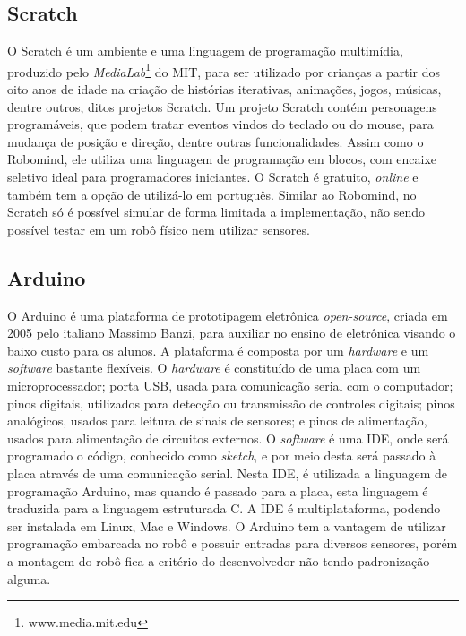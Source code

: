\subsection{Scratch}
O Scratch é um ambiente e uma linguagem de programação multimídia, produzido pelo \textit{MediaLab}\footnote{www.media.mit.edu} do MIT, para ser utilizado por crianças a partir dos oito anos de idade na criação de histórias iterativas, animações, jogos, músicas, dentre outros, ditos projetos Scratch. 
Um projeto Scratch contém personagens programáveis, que podem tratar eventos vindos do teclado ou do mouse, para mudança de posição e direção, dentre outras funcionalidades.
Assim como o Robomind, ele utiliza uma linguagem de programação em blocos, com encaixe seletivo ideal para programadores iniciantes. O Scratch é gratuito, \textit{online} e também tem a opção de utilizá-lo em português.
Similar ao Robomind, no Scratch só é possível simular de forma limitada a implementação, não sendo possível testar em um robô físico nem utilizar sensores.

\subsection{Arduino}
O Arduino é uma plataforma de prototipagem eletrônica \textit{open-source}, criada em 2005 pelo italiano Massimo Banzi, para auxiliar no ensino de eletrônica visando o baixo custo para os alunos. A plataforma é composta por um \textit{hardware} e um \textit{software} bastante flexíveis. 
O \textit{hardware} é constituído de uma placa com um microprocessador; porta USB, usada para comunicação serial com o computador; pinos digitais, utilizados para detecção ou transmissão de controles digitais; pinos analógicos, usados para leitura de sinais de sensores; e pinos de alimentação, usados para alimentação de circuitos externos. 
O \textit{software} é uma IDE, onde será programado o código, conhecido como \textit{sketch}, e por meio desta será passado à placa através de uma comunicação serial. Nesta IDE, é utilizada a linguagem de programação Arduino, mas quando é passado para a placa, esta linguagem é traduzida para a linguagem estruturada C. A IDE é multiplataforma, podendo ser instalada em Linux, Mac e Windows.
O Arduino tem a vantagem de utilizar programação embarcada no robô e possuir entradas para diversos sensores, porém a montagem do robô fica a critério do desenvolvedor não tendo padronização alguma.

